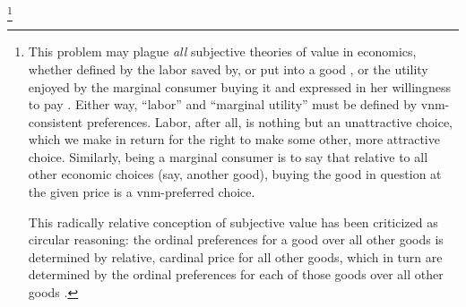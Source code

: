 \footnote{
	This problem may plague \emph{all} subjective theories of value in economics, whether defined by the labor saved by, or put into a good \citep{Smith-1776-lq,Ricardo1817,Marx-1867-aa}, or the utility enjoyed by the marginal consumer buying it and expressed in her willingness to pay \citep[for example,][]{Walras1874}.
	Either way, ``labor'' and ``marginal utility'' must be defined by \gls{vnm}-consistent preferences.
	Labor, after all, is nothing but an unattractive choice, which we make in return for the right to make some other, more attractive choice.
	Similarly, being a marginal consumer is to say that relative to all other economic choices (say, another good), buying the good in question at the given price is a \gls{vnm}-preferred choice.

	This radically relative conception of subjective value has been criticized as circular reasoning:
	the ordinal preferences for a good over all other goods is determined by relative, cardinal price for all other goods, which in turn are determined by the ordinal preferences for each of those goods over all other goods \cite[confer][]{Mattick1978}.
}

